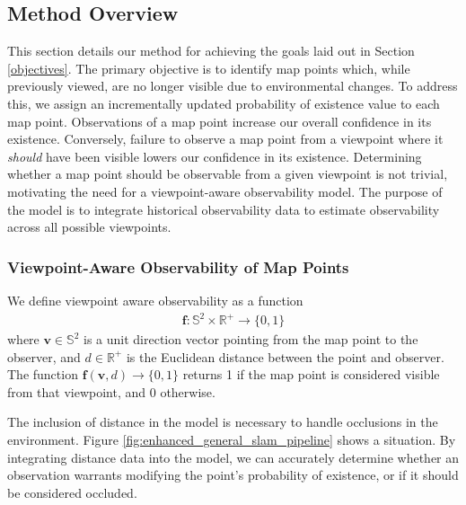\subsection{Method Overview}

This section details our method for achieving the goals laid out in Section \ref{objectives}. The primary objective is to identify map points which, while previously viewed, are no longer visible due to environmental changes. To address this, we assign an incrementally updated probability of existence value to each map point. Observations of a map point increase our overall confidence in its existence. Conversely, failure to observe a map point from a viewpoint where it \textit{should} have been visible lowers our confidence in its existence. Determining whether a map point should be observable from a given viewpoint is not trivial, motivating the need for a viewpoint-aware observability model. The purpose of the model is to integrate historical observability data to estimate observability across all possible viewpoints.

\subsubsection{Viewpoint-Aware Observability of Map Points}


We define viewpoint aware observability as a function
\begin{align*}
    \boldsymbol{f:}\mathbb{S}^2\times\mathbb{R}^+\rightarrow\{0,1\}
\end{align*}
where $\mathbf{v}\in\mathbb{S}^2$ is a unit direction vector pointing from the map point to the observer, and $d\in\mathbb{R}^+$ is the Euclidean distance between the point and observer. The function $\boldsymbol{f}(\mathbf{v}, d)\rightarrow\{0,1\}$ returns 1 if the map point is considered visible from that viewpoint, and 0 otherwise.


The inclusion of distance in the model is necessary to handle occlusions in the environment. Figure \ref{fig:enhanced_general_slam_pipeline} shows a situation. By integrating distance data into the model, we can accurately determine whether an observation warrants modifying the point's probability of existence, or if it should be considered occluded.

